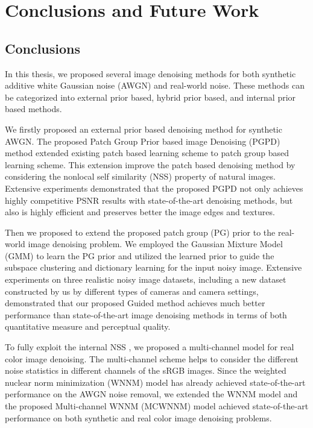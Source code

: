 %
\chapter{Conclusions and Future Work}
\label{sec:conclusions}


\section{Conclusions}
\label{sec:conclusions:sec1}
In this thesis, we proposed several image denoising methods for both synthetic additive white Gaussian noise (AWGN) and real-world noise. These methods can be categorized into external prior based, hybrid prior based, and internal prior based methods.

We firstly proposed an external prior based denoising method for synthetic AWGN. The proposed Patch Group Prior based image Denoising (PGPD) method extended existing patch based learning scheme \cite{epll} to patch group based learning scheme. This extension improve the patch based denoising method by considering the nonlocal self similarity (NSS) property of natural images. Extensive experiments demonstrated that the proposed PGPD not only achieves highly competitive PSNR results with state-of-the-art denoising methods, but also is highly efficient and preserves better the image edges and textures.

Then we proposed to extend the proposed patch group (PG) prior to the real-world image denoising problem. We employed the Gaussian Mixture Model (GMM) to learn the PG prior and utilized the learned prior to guide the subspace clustering and dictionary learning for the input noisy image. Extensive experiments on three realistic noisy image datasets, including a new dataset constructed by us by different types of cameras and camera settings, demonstrated that our proposed Guided method achieves much better performance than state-of-the-art image denoising methods in terms of both quantitative measure and perceptual quality.

To fully exploit the internal NSS , we proposed a multi-channel model for real color image denoising. The multi-channel scheme helps to consider the different noise statistics in different channels of the sRGB images. Since the weighted nuclear norm minimization (WNNM) model has already achieved state-of-the-art performance on the AWGN noise removal, we extended the WNNM model and the proposed Multi-channel WNNM (MCWNNM) model achieved state-of-the-art performance on both synthetic and real color image denoising problems. 

